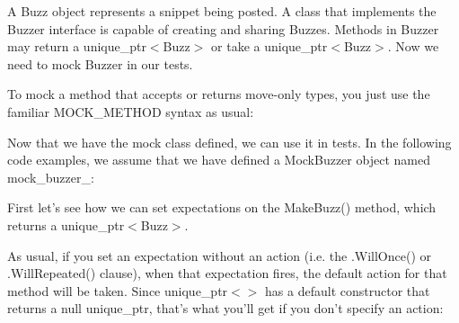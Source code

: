A {\ttfamily Buzz} object represents a snippet being posted. A class that implements the {\ttfamily Buzzer} interface is capable of creating and sharing {\ttfamily Buzz}es. Methods in {\ttfamily Buzzer} may return a {\ttfamily unique\+\_\+ptr$<$Buzz$>$} or take a {\ttfamily unique\+\_\+ptr$<$Buzz$>$}. Now we need to mock {\ttfamily Buzzer} in our tests.

To mock a method that accepts or returns move-\/only types, you just use the familiar {\ttfamily M\+O\+C\+K\+\_\+\+M\+E\+T\+H\+OD} syntax as usual\+:


\begin{DoxyCode}{0}
\DoxyCodeLine{ \textcolor{keyword}{public}:}
\DoxyCodeLine{\};}
\end{DoxyCode}


Now that we have the mock class defined, we can use it in tests. In the following code examples, we assume that we have defined a {\ttfamily Mock\+Buzzer} object named {\ttfamily mock\+\_\+buzzer\+\_\+}\+:


\begin{DoxyCode}{0}
\end{DoxyCode}


First let’s see how we can set expectations on the {\ttfamily Make\+Buzz()} method, which returns a {\ttfamily unique\+\_\+ptr$<$Buzz$>$}.

As usual, if you set an expectation without an action (i.\+e. the {\ttfamily .Will\+Once()} or {\ttfamily .Will\+Repeated()} clause), when that expectation fires, the default action for that method will be taken. Since {\ttfamily unique\+\_\+ptr$<$$>$} has a default constructor that returns a null {\ttfamily unique\+\_\+ptr}, that’s what you’ll get if you don’t specify an action\+:


\begin{DoxyCode}{0}
\DoxyCodeLine{\textcolor{comment}{// Use the default action.}}
\DoxyCodeLine{}
\DoxyCodeLine{\textcolor{comment}{// Triggers the previous EXPECT\_CALL.}}
\end{DoxyCode}


